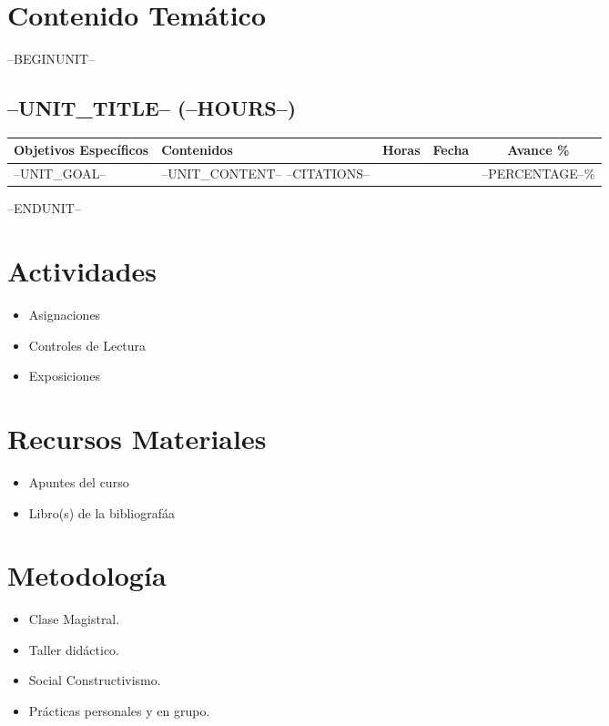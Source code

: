 \documentclass[a4paper]{article}
\begin{document}
\section{Contenido Temático}
--BEGINUNIT--
\subsection{--UNIT_TITLE-- (--HOURS--)}
\begin{tabularx}{\textwidth}{|X|X|c|c|c|} \hline
\textbf{Objetivos Específicos} &   \textbf{Contenidos} & \textbf{Horas} & \textbf{Fecha} & \textbf{Avance \%}  \\ \hline
--UNIT_GOAL--      & 
--UNIT_CONTENT--
--CITATIONS-- &
&
&
--PERCENTAGE--\% \\ \hline
\end{tabularx}

--ENDUNIT--


\section{Actividades}
\begin{itemize}
\item Asignaciones
\item Controles de Lectura
\item Exposiciones
\end{itemize} 

\section{Recursos Materiales}
\begin{itemize}
\item Apuntes del curso
\item Libro(s) de la bibliografáa
\end{itemize} 

\section{Metodología}
\begin{itemize}
\item Clase Magistral.
\item Taller didáctico.
\item Social Constructivismo.
\item Prácticas personales y en grupo.
\end{itemize} 
\end{document}
